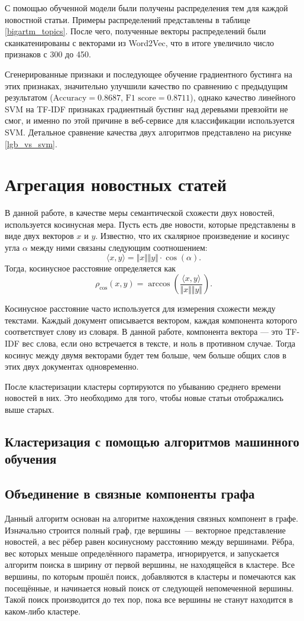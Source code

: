 \documentclass[a4paper, 14pt]{extarticle}
\begin{document}
С помощью обученной модели были получены распределения тем для каждой новостной статьи.
Примеры распределений представлены в таблице \ref{bigartm_topics}. После чего, полученные векторы распределений
были сканкатенированы с векторами из Word2Vec, что в итоге увеличило число признаков с 300 до 450.

Сгенерированные признаки и последующее обучение градиентного бустинга на этих признаках, значительно улучшили качество по сравнению
с предыдущим результатом ($\text{Accuracy} = 0.8687$, $\text{F1 score} = 0.8711$), однако качество линейного SVM на TF-IDF признаках
градиентный бустинг над деревьями превзойти не смог, и именно по этой причине в веб-сервисе для классификации используется SVM.
Детальное сравнение качества двух алгоритмов представлено на рисунке \ref{lgb_vs_svm}.

\section{Агрегация новостных статей}
В данной работе, в качестве меры семантической схожести двух новостей, используется косинусная мера.
Пусть есть две новости, которые представлены в виде двух векторов $x$ и $y$. Известно, что их скалярное произведение
и косинус угла $\alpha$ между ними связаны следующим соотношением:
$$
\langle x,y \rangle = \Vert x \Vert \Vert y \Vert \cdot \cos(\alpha).
$$
Тогда, косинусное расстояние определяется как
$$
\rho_{\cos}(x, y) = \arccos\left(\frac{\langle x,y \rangle}{\Vert x \Vert \Vert y \Vert} \right).
$$

Косинусное расстояние часто используется для измерения схожести между текстами.
Каждый документ описывается вектором, каждая компонента которого соответствует слову из словаря. В данной работе, компонента
вектора --- это TF-IDF вес слова, если оно встречается в тексте, и ноль в противном случае.
Тогда косинус между двумя векторами будет тем больше, чем больше общих слов в этих двух документах одновременно.

После кластеризации кластеры сортируются по убыванию среднего времени новостей в них. Это необходимо для того, чтобы новые
статьи отображались выше старых.

\subsection{Кластеризация с помощью алгоритмов машинного обучения}

\subsection{Объединение в связные компоненты графа}
Данный алгоритм основан на алгоритме нахождения связных компонент в графе. Изначально строится полный граф,
где вершины~--- векторное представление новостей, а вес рёбер равен косинусному расстоянию между вершинами.
Рёбра, вес которых меньше определённого параметра, игнорируется, и запускается алгоритм поиска в ширину
от первой вершины, не находящейся в кластере. Все вершины, по которым прошёл поиск, добавляются
в кластеры и помечаются как посещённые, и начинается новый поиск от следующей непомеченной вершины.
Такой поиск производится до тех пор, пока все вершины не станут находится в каком-либо кластере.
\end{document}
